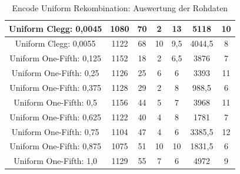 \begin{table}[H]
\begin{tabular}{c | c | c | c | c | c | c}
		\hline
		Uniform Clegg: 0,0045 & 1080 & 70 & 2 & 13 & 5118 & 10\\
		\hline
		Uniform Clegg: 0,0055 & 1122 & 68 & 10 & 9,5 & 4044,5 & 8\\
		\hline
		Uniform One-Fifth: 0,125 & 1152 & 18 & 2 & 6,5 & 3876 & 7\\
		\hline
		Uniform One-Fifth: 0,25 & 1126 & 25 & 6 & 6 & 3393 & 11\\
		\hline
		Uniform One-Fifth: 0,375 & 1128 & 29 & 2 & 8 & 988,5 & 6\\
		\hline
		Uniform One-Fifth: 0,5 & 1156 & 44 & 5 & 7 & 3968 & 11\\
		\hline
		Uniform One-Fifth: 0,625 & 1122 & 40 & 4 & 8 & 1781 & 7\\
		\hline
		Uniform One-Fifth: 0,75 & 1104 & 47 & 4 & 6 & 3385,5 & 12\\
		\hline
		Uniform One-Fifth: 0,875 & 1075 & 51 & 10 & 10 & 1831,5 & 6\\
		\hline
		Uniform One-Fifth: 1,0 & 1129 & 55 & 7 & 6 & 4972 & 9\\
	\end{tabular}
	\caption{Encode Uniform Rekombination: Auswertung der Rohdaten}
	\label{table:encodeUniformRohdaten}
\end{table}

